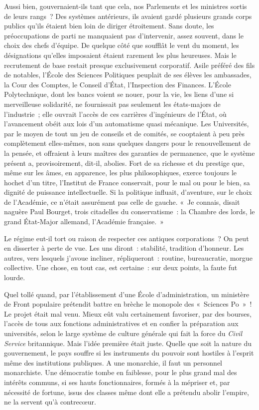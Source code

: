 \documentclass[french,twoside]{book} %
\begin{document}
Aussi bien, gouvernaient-ils tant que cela, nos Parlements et les ministres sortis de leurs rangs ? Des systèmes antérieurs, ils avaient gardé plusieurs grands corps publics qu’ils étaient bien loin de diriger étroitement. Sans doute, les préoccupations de parti ne manquaient pas d’intervenir, assez souvent, dans le choix des chefs d’équipe. De quelque côté que soufflât le vent du moment, les désignations qu’elles imposaient étaient rarement les plus heureuses. Mais le recrutement de base restait presque exclusivement corporatif. Asile préféré des fils de notables, l’École des Sciences Politiques peuplait de ses élèves les ambassades, la Cour des Comptes, le Conseil d’État, l’Inspection des Finances. L’École Polytechnique, dont les bancs voient se nouer, pour la vie, les liens d’une si merveilleuse solidarité, ne fournissait pas seulement les états-majors de l’industrie ; elle ouvrait l’accès de ces carrières d’ingénieurs de l’État, où l’avancement obéit aux lois d’un automatisme quasi mécanique. Les Universités, par le moyen de tout un jeu de conseils et de comités, se cooptaient à peu près complètement elles-mêmes, non sans quelques dangers pour le renouvellement   de la pensée, et offraient à leurs maîtres des garanties de permanence, que le système présent a, provisoirement, dit-il, abolies. Fort de sa richesse et du prestige que, même sur les âmes, en apparence, les plus philosophiques, exerce toujours le hochet d’un titre, l’Institut de France conservait, pour le mal ou pour le bien, sa dignité de puissance intellectuelle. Si la politique influait, d’aventure, sur le choix de l’Académie, ce n’était assurément pas celle de gauche. « Je connais, disait naguère Paul Bourget, trois citadelles du conservatisme : la Chambre des lords, le grand État-Major allemand, l’Académie française. »\par
Le régime eut-il tort ou raison de respecter ces antiques corporations ? On peut en disserter à perte de vue. Les uns diront : stabilité, tradition d’honneur. Les autres, vers lesquels j’avoue incliner, répliqueront : routine, bureaucratie, morgue collective. Une chose, en tout cas, est certaine : sur deux points, la faute fut lourde.\par
Quel tollé quand, par l’établissement d’une École d’administration, un ministère de Front populaire prétendit battre en brèche le monopole des « Sciences Po » ! Le projet était mal venu. Mieux eût valu certainement favoriser, par des bourses, l’accès de tous aux fonctions administratives et en confier la préparation aux universités, selon le large système de culture générale qui fait la force du {\itshape Civil Service} britannique. Mais l’idée première était juste. Quelle que soit la nature du gouvernement, le pays souffre si les instruments du pouvoir sont hostiles à l’esprit même des institutions publiques. A une monarchie, il faut un personnel monarchiste. Une démocratie tombe en faiblesse, pour le plus grand mal des intérêts communs, si ses hauts fonctionnaires, formés à la mépriser et, par nécessité de fortune, issus des classes même dont elle a prétendu abolir l’empire, ne la servent qu’à contrecœur.\par
\end{document}
